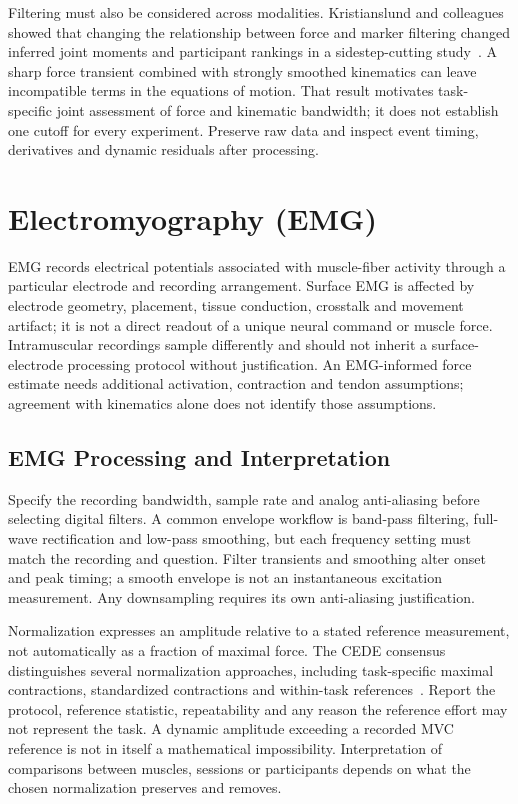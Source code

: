 Filtering must also be considered across modalities.
Kristianslund and colleagues showed that changing the relationship between force and marker filtering changed inferred joint moments and participant rankings in a sidestep-cutting study~\cite{Kristianslund2012Filtering}.
A sharp force transient combined with strongly smoothed kinematics can leave incompatible terms in the equations of motion.
That result motivates task-specific joint assessment of force and kinematic bandwidth; it does not establish one cutoff for every experiment.
Preserve raw data and inspect event timing, derivatives and dynamic residuals after processing.

\section{Electromyography (EMG)}

EMG records electrical potentials associated with muscle-fiber activity through a particular electrode and recording arrangement.
Surface EMG is affected by electrode geometry, placement, tissue conduction, crosstalk and movement artifact; it is not a direct readout of a unique neural command or muscle force.
Intramuscular recordings sample differently and should not inherit a surface-electrode processing protocol without justification.
An EMG-informed force estimate needs additional activation, contraction and tendon assumptions; agreement with kinematics alone does not identify those assumptions.

\subsection{EMG Processing and Interpretation}

Specify the recording bandwidth, sample rate and analog anti-aliasing before selecting digital filters.
A common envelope workflow is band-pass filtering, full-wave rectification and low-pass smoothing, but each frequency setting must match the recording and question.
Filter transients and smoothing alter onset and peak timing; a smooth envelope is not an instantaneous excitation measurement.
Any downsampling requires its own anti-aliasing justification.

Normalization expresses an amplitude relative to a stated reference measurement, not automatically as a fraction of maximal force.
The CEDE consensus distinguishes several normalization approaches, including task-specific maximal contractions, standardized contractions and within-task references~\cite{Besomi2020Normalization}.
Report the protocol, reference statistic, repeatability and any reason the reference effort may not represent the task.
A dynamic amplitude exceeding a recorded MVC reference is not in itself a mathematical impossibility.
Interpretation of comparisons between muscles, sessions or participants depends on what the chosen normalization preserves and removes.

